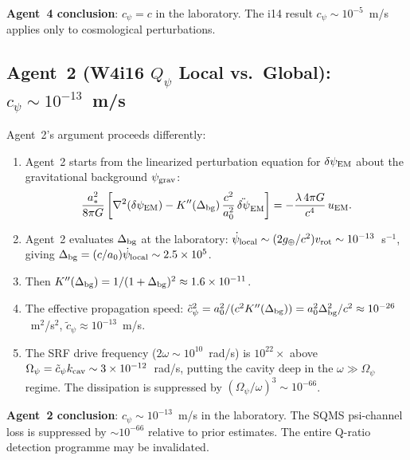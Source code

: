 \documentclass[11pt]{article}
\newcommand{\ee}[1]{\times 10^{#1}}
\newcommand{\dpsiEM}{\delta\psi_{\rm EM}}
\newcommand{\Opsi}{\Omega_\psi}
\begin{document}
\textbf{Agent~4 conclusion}: $c_\psi = c$ in the laboratory. The i14
result $c_\psi \sim 10^{-5}$~m/s applies only to cosmological
perturbations.

\subsection{Agent~2 (W4i16 $Q_\psi$ Local vs.\ Global): $c_\psi \sim 10^{-13}$~m/s}

Agent~2's argument proceeds differently:

\begin{enumerate}
\item Agent~2 starts from the linearized perturbation equation for
  $\dpsiEM$ about the gravitational background $\psi_{\rm grav}$:
  \begin{equation}
  \frac{a_*^2}{8\pi G}\left[
    \nabla^2(\dpsiEM) - K''(\Delta_{\rm bg})\,\frac{c^2}{a_0^2}\,
    \ddot{\delta\psi}_{\rm EM}
  \right] = -\frac{\lambda\,4\pi G}{c^4}\,u_{\rm EM}.
  \label{eq:agent2-eom}
  \end{equation}

\item Agent~2 evaluates $\Delta_{\rm bg}$ at the laboratory:
  $\dot\psi_{\rm local} \sim (2g_\oplus/c^2)v_{\rm rot} \sim 10^{-13}$~s$^{-1}$,
  giving $\Delta_{\rm bg} = (c/a_0)\dot\psi_{\rm local} \sim 2.5\ee{5}$.

\item Then $K''(\Delta_{\rm bg}) = 1/(1+\Delta_{\rm bg})^2 \approx 1.6\ee{-11}$.

\item The effective propagation speed:
  $\tilde{c}_\psi^2 = a_0^2/(c^2 K''(\Delta_{\rm bg}))
  = a_0^2\Delta_{\rm bg}^2/c^2 \approx 10^{-26}$~m$^2$/s$^2$,
  $\tilde{c}_\psi \approx 10^{-13}$~m/s.

\item The SRF drive frequency ($2\omega \sim 10^{10}$~rad/s) is
  $10^{22}\times$ above $\Opsi = \tilde{c}_\psi k_{\rm cav} \sim
  3\ee{-12}$~rad/s, putting the cavity deep in the
  $\omega \gg \Opsi$ regime. The dissipation is suppressed by
  $(\Opsi/\omega)^3 \sim 10^{-66}$.
\end{enumerate}

\textbf{Agent~2 conclusion}: $c_\psi \sim 10^{-13}$~m/s in the
laboratory. The SQMS psi-channel loss is suppressed by $\sim 10^{-66}$
relative to prior estimates. The entire Q-ratio detection programme
may be invalidated.


\end{document}
